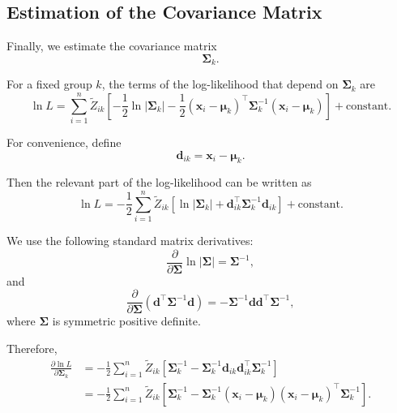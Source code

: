 \subsection{Estimation of the Covariance Matrix}

Finally, we estimate the covariance matrix
\begin{equation*}
\boldsymbol{\Sigma}_k.
\end{equation*}

For a fixed group $k$, the terms of the log-likelihood that depend
on $\boldsymbol{\Sigma}_k$ are
\begin{equation*}
\ln L
=
\sum_{i=1}^n
\tilde{Z}_{ik}
\left[
-\frac{1}{2}\ln|\boldsymbol{\Sigma}_k|
-\frac{1}{2}
(\boldsymbol{x}_i-\boldsymbol{\mu}_k)^\top
\boldsymbol{\Sigma}_k^{-1}
(\boldsymbol{x}_i-\boldsymbol{\mu}_k)
\right]
+
\text{constant}.
\end{equation*}

For convenience, define
\begin{equation*}
\boldsymbol{d}_{ik}
=
\boldsymbol{x}_i-\boldsymbol{\mu}_k.
\end{equation*}

Then the relevant part of the log-likelihood can be written as
\begin{equation*}
\ln L
=
-\frac{1}{2}
\sum_{i=1}^n
\tilde{Z}_{ik}
\left[
\ln|\boldsymbol{\Sigma}_k|
+
\boldsymbol{d}_{ik}^\top
\boldsymbol{\Sigma}_k^{-1}
\boldsymbol{d}_{ik}
\right]
+
\text{constant}.
\end{equation*}

We use the following standard matrix derivatives:
\begin{equation*}
\frac{\partial}{\partial\boldsymbol{\Sigma}}
\ln|\boldsymbol{\Sigma}|
=
\boldsymbol{\Sigma}^{-1},
\end{equation*}
and
\begin{equation*}
\frac{\partial}{\partial\boldsymbol{\Sigma}}
\left(
\boldsymbol{d}^\top
\boldsymbol{\Sigma}^{-1}
\boldsymbol{d}
\right)
=
-\boldsymbol{\Sigma}^{-1}
\boldsymbol{d}\boldsymbol{d}^\top
\boldsymbol{\Sigma}^{-1},
\end{equation*}
where $\boldsymbol{\Sigma}$ is symmetric positive definite.

Therefore,
\begin{align*}
\frac{\partial\ln L}
{\partial\boldsymbol{\Sigma}_k}
&=
-\frac{1}{2}
\sum_{i=1}^n
\tilde{Z}_{ik}
\left[
\boldsymbol{\Sigma}_k^{-1}
-
\boldsymbol{\Sigma}_k^{-1}
\boldsymbol{d}_{ik}\boldsymbol{d}_{ik}^\top
\boldsymbol{\Sigma}_k^{-1}
\right]\\
&=
-\frac{1}{2}
\sum_{i=1}^n
\tilde{Z}_{ik}
\left[
\boldsymbol{\Sigma}_k^{-1}
-
\boldsymbol{\Sigma}_k^{-1}
(\boldsymbol{x}_i-\boldsymbol{\mu}_k)
(\boldsymbol{x}_i-\boldsymbol{\mu}_k)^\top
\boldsymbol{\Sigma}_k^{-1}
\right].
\end{align*}

